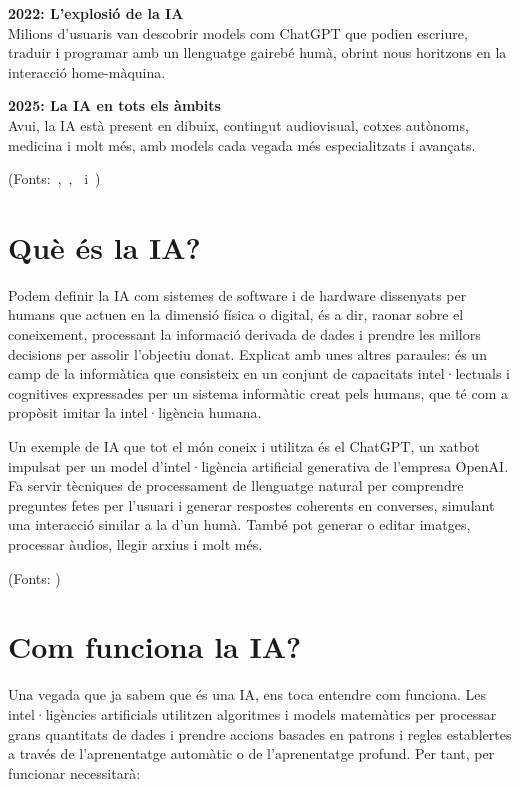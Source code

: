 \begin{enumerate}
    \textbf{2022: L'explosió de la IA}\\
    Milions d'usuaris van descobrir models com ChatGPT que podien escriure, traduir i programar amb un llenguatge gairebé humà, obrint nous horitzons en la interacció home-màquina.

    \textbf{2025: La IA en tots els àmbits}\\
    Avui, la IA està present en dibuix, contingut audiovisual, cotxes autònoms, medicina i molt més, amb models cada vegada més especialitzats i avançats.
\end{enumerate}

(Fonts:~\cite{McCarthy_Minsky_Rochester_Shannon_2006},~\cite{deepblue},~\cite{chatGPT2022} i~\cite{10.1093/mind/LIX.236.433})

\section{Què és la IA?}

Podem definir la IA com sistemes de software i de hardware dissenyats per humans que actuen en la dimensió física o digital, és a dir, raonar sobre el coneixement, processant la informació derivada de dades i prendre les millors decisions per assolir l'objectiu donat. Explicat amb unes altres paraules: és un camp de la informàtica que consisteix en un conjunt de capacitats intel·lectuals i cognitives expressades per un sistema informàtic creat pels humans, que té com a propòsit imitar la intel·ligència humana.

Un exemple de IA que tot el món coneix i utilitza és el ChatGPT, un xatbot impulsat per un model d'intel·ligència artificial generativa de l'empresa OpenAI. Fa servir tècniques de processament de llenguatge natural per comprendre preguntes fetes per l'usuari i generar respostes coherents en converses, simulant una interacció similar a la d'un humà. També pot generar o editar imatges, processar àudios, llegir arxius i molt més.

\par(Fonts: \cite{QueÉsLaIA})
\section{Com funciona la IA?}

Una vegada que ja sabem que és una IA, ens toca entendre com funciona. Les intel·ligències artificials utilitzen algoritmes i models matemàtics per processar grans quantitats de dades i prendre accions basades en patrons i regles establertes a través de l'aprenentatge automàtic o de l'aprenentatge profund. Per tant, per funcionar necessitarà:

